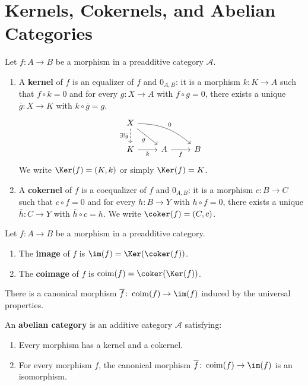 \section{Kernels, Cokernels, and Abelian Categories}\label{sec:abelian-def}

\begin{definition}\label{def:kernel-cokernel}
Let $f \colon A \to B$ be a morphism in a preadditive category $\mathcal{A}$.
\begin{enumerate}
    \item A \textbf{kernel} of $f$ is an equalizer of $f$ and $0_{A,B}$: it is a morphism
    $k \colon K \to A$ such that $f \circ k = 0$ and for every $g \colon X \to A$ with
    $f \circ g = 0$, there exists a unique $\bar{g} \colon X \to K$ with $k \circ \bar{g} = g$.
    \[
    \begin{tikzcd}
        X \arrow[rd, "g"'] \arrow[rrd, "0", bend left=20] \arrow[d, dashed, "\exists!\bar{g}"'] \\
        K \arrow[r, "k"'] & A \arrow[r, "f"'] & B
    \end{tikzcd}
    \]
    We write $\Ker(f) = (K, k)$ or simply $\Ker(f) = K$.
    \item A \textbf{cokernel} of $f$ is a coequalizer of $f$ and $0_{A,B}$: it is a morphism
    $c \colon B \to C$ such that $c \circ f = 0$ and for every $h \colon B \to Y$ with
    $h \circ f = 0$, there exists a unique $\bar{h} \colon C \to Y$ with $\bar{h} \circ c = h$.
    We write $\coker(f) = (C, c)$.
\end{enumerate}
\end{definition}

\begin{definition}\label{def:image-coimage}
Let $f \colon A \to B$ be a morphism in a preadditive category.
\begin{enumerate}
    \item The \textbf{image} of $f$ is $\im(f) = \Ker(\coker(f))$.
    \item The \textbf{coimage} of $f$ is $\operatorname{coim}(f) = \coker(\Ker(f))$.
\end{enumerate}
There is a canonical morphism $\overline{f} \colon \operatorname{coim}(f) \to \im(f)$
induced by the universal properties.
\end{definition}

\begin{definition}\label{def:abelian-cat}
An \textbf{abelian category} is an additive category $\mathcal{A}$ satisfying:
\begin{enumerate}
    \item[(AB1)] Every morphism has a kernel and a cokernel.
    \item[(AB2)] For every morphism $f$, the canonical morphism
    $\overline{f} \colon \operatorname{coim}(f) \to \im(f)$ is an isomorphism.
\end{enumerate}
\end{definition}


